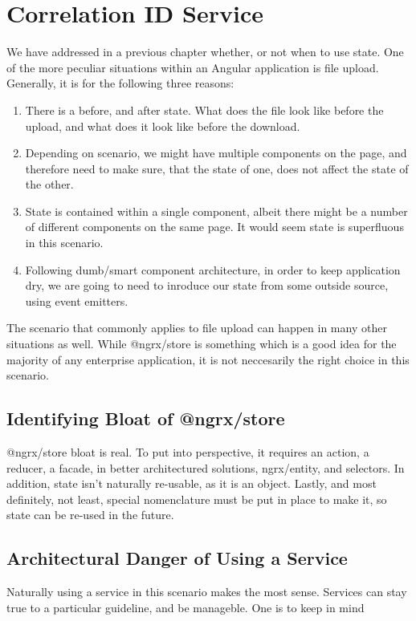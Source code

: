 \section{ Correlation ID Service }
\maketitle{}

We have addressed in a previous chapter whether, or not when to use state. One
of the more peculiar situations within an Angular application is file upload.
Generally, it is for the following three reasons:
\begin{enumerate}
  \item There is a before, and after state. What does the file look like before
  the upload, and what does it look like before the download.
  \item Depending on scenario, we might have multiple components on the page,
  and therefore need to make sure, that the state of one, does not affect the
  state of the other.
  \item State is contained within a single component, albeit there might be a
  number of different components on the same page. It would seem state is
  superfluous in this scenario.
  \item Following dumb/smart component architecture, in order to keep
  application dry, we are going to need to inroduce our state from some outside
  source, using event emitters.
\end{enumerate}

The scenario that commonly applies to file upload can happen in many other
situations as well. While @ngrx/store is something which is a good idea for the
majority of any enterprise application, it is not neccesarily the right choice
in this scenario.

\subsection{Identifying Bloat of @ngrx/store}
@ngrx/store bloat is real. To put into perspective, it requires an action, a
reducer, a facade, in better architectured solutions, ngrx/entity, and
selectors. In addition, state isn't naturally re-usable, as it is an object.
Lastly, and most definitely, not least, special nomenclature must be put in
place to make it, so state can be re-used in the future.

\subsection{Architectural Danger of Using a Service}
Naturally using a service in this scenario makes the most sense. Services can
stay true to a particular guideline, and be manageble. One is to keep in mind 
